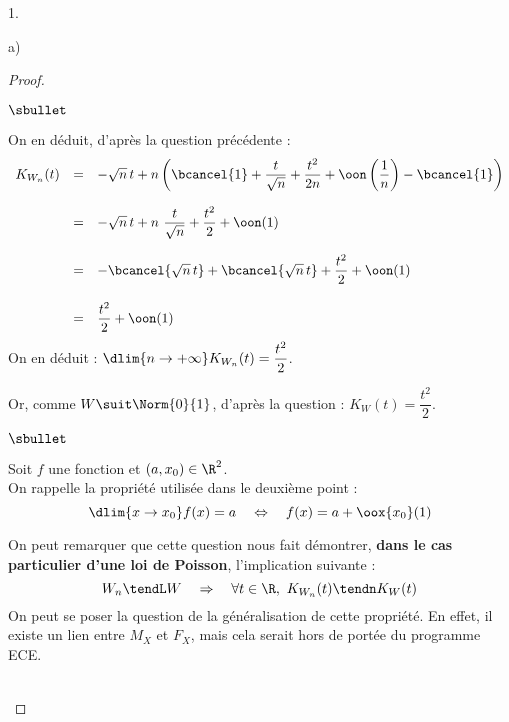 \documentclass[11pt]{article}%
\begin{document}
\begin{noliste}{1.}
\begin{noliste}{a)}
\begin{proof}
\begin{noliste}{$\sbullet$}
      \item On en déduit, d'après la question précédente :
        \[
          \begin{array}{rcl}
            K_{W_n}(t)
            & = & -\sqrt{n} \, t + n \left(\bcancel{1} +
                  \dfrac{t}{\sqrt{n}} + \dfrac{t^2}{2n} + \oon\left(
                  \dfrac{1}{n}\right) - \bcancel{1} \right)
            \\[.6cm]
            & = & -\sqrt{n} \, t + n \ \dfrac{t}{\sqrt{n}} +
                  \dfrac{t^2}{2} + \oon (1)
            \\[.6cm]
            & = & -\bcancel{\sqrt{n} \, t} + \bcancel{\sqrt{n} \, t} +
                  \dfrac{t^2}{2} + \oon(1)
            \\[.6cm]
            & = & \dfrac{t^2}{2} + \oon(1)
          \end{array}
        \]
        On en déduit : $\dlim{n \to +\infty} K_{W_n}(t) =
        \dfrac{t^2}{2}$.
        
      \item Or, comme $W \suit \Norm{0}{1}$, d'après la question
         : $K_W(t) = \dfrac{t^2}{2}$.
      \end{noliste}
      \begin{remark}
        \begin{noliste}{$\sbullet$}
        \item Soit $f$ une fonction et $(a,x_0) \in \R^2$.\\
          On rappelle la propriété utilisée dans le deuxième point
          :
          \[
            \dlim{x \to x_0} f(x) = a \quad \Leftrightarrow \quad f(x)
            = a + \oox{x_0}(1)
          \]
          
        \item On peut remarquer que cette question  nous
          fait démontrer, {\bf dans le cas particulier d'une loi de
            Poisson}, l'implication suivante :
          \[
            W_n \tendL W \quad \Rightarrow \quad \forall t \in \R, \
            K_{W_n}(t) \tendn K_W(t)
          \]
          On peut se poser la question de la généralisation de cette
          propriété. En effet, il existe un lien entre $M_X$ et $F_X$,
          mais cela serait hors de portée du programme ECE.
        \end{noliste}
      \end{remark}~\\[-1.4cm]
    \end{proof}
  \end{noliste}
\end{noliste}
\end{document}
